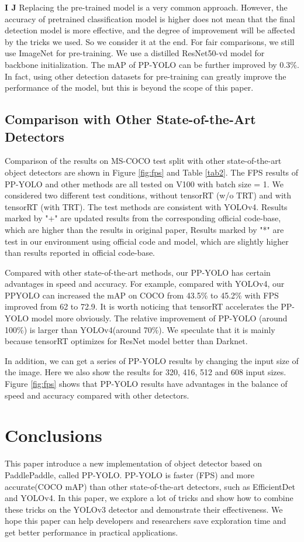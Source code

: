 \documentclass[10pt,twocolumn,letterpaper]{article}
\newcommand{\pheadB}[1] {\vspace{1mm}\noindent\textbf{#1}}
\begin{document}
	\pheadB{I  J} 
	Replacing the pre-trained model is a very common approach. However, the accuracy of pretrained classification model is higher does not mean that the final detection model is more effective, and the degree of improvement will be affected by the tricks we used. So we consider it at the end.
	For fair comparisons, we still use ImageNet for pre-training. We use a distilled ResNet50-vd model for backbone initialization. The mAP of PP-YOLO can be further improved by 0.3\%. In fact, using other detection datasets for pre-training can greatly improve the performance of the model, but this is beyond the scope of this paper.
	
	\subsection{Comparison with Other State-of-the-Art Detectors}	
	
	Comparison of the results on MS-COCO test split with other state-of-the-art object detectors are shown in Figure \ref{fig:fps} and Table \ref{tab2}. The FPS results of PP-YOLO and other methods are all tested on V100 with batch size = 1. 
	We considered two different test conditions, without tensorRT (w/o TRT) and with tensorRT (with TRT). The test methods are consistent with YOLOv4\cite{yolov4}. 
	Results marked by "+" are updated results from the corresponding official code-base, which are higher than the results in original paper, 
	Results marked by "*" are test in our environment using official code and model, which are slightly higher than results reported in official code-base.
	
	Compared with other state-of-the-art methods, our PP-YOLO has certain advantages in speed and accuracy. For example, compared with YOLOv4, our PPYOLO can increased the mAP on COCO from 43.5\% to 45.2\% with FPS improved from 62 to 72.9. It is worth noticing that tensorRT accelerates the PP-YOLO model more obviously. The relative improvement of PP-YOLO (around 100\%) is larger than YOLOv4(around 70\%). We speculate that it is mainly because tensorRT optimizes for ResNet model better than Darknet.
	
	In addition, we can get a series of PP-YOLO results by changing the input size of the image. Here we also show the results for 320, 416, 512 and 608 input sizes. Figure \ref{fig:fps} shows that PP-YOLO results have advantages in the balance of speed and accuracy compared with other detectors.
	
	\section{Conclusions}
	
	This paper introduce a new implementation of object detector based on PaddlePaddle, called PP-YOLO.  PP-YOLO is faster (FPS) and more accurate(COCO mAP) than other state-of-the-art detectors, such as EfficientDet and YOLOv4. In this paper, we explore a lot of tricks and show how to combine these tricks on the YOLOv3 detector and demonstrate their effectiveness. We hope this paper can help developers and researchers save exploration time and get better performance in practical applications.
	
	
	
\end{document}
